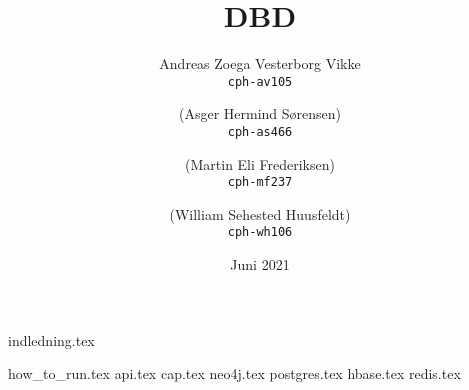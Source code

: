 \documentclass[10pt]{article}
\title{DBD}
\author{
    Andreas Zoega Vesterborg Vikke\\
    \texttt{cph-av105}
    \and
    (Asger Hermind Sørensen)\\
    \texttt{cph-as466}
    \and
    (Martin Eli Frederiksen)\\
    \texttt{cph-mf237}
    \and
    (William Sehested Huusfeldt)\\
    \texttt{cph-wh106}
}
\date{Juni 2021}
\begin{document}
\hypersetup{pageanchor=false}

\listoftodos
{}

\maketitle
\newpage
{indledning.tex}
\tableofcontents
\newpage

{how_to_run.tex}
\newpage
{api.tex}
{cap.tex}
{neo4j.tex}
{postgres.tex}
{hbase.tex}
{redis.tex}

\newpage


\end{document}
